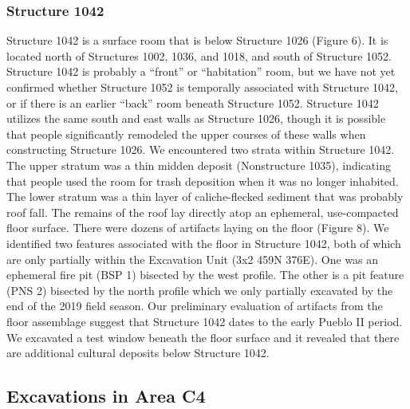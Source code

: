 \documentclass[
  12pt,
]{krantz}
\begin{document}
\hypertarget{structure-1042}{%
\subsubsection{Structure 1042}\label{structure-1042}}

Structure 1042 is a surface room that is below Structure 1026 (Figure
6). It is located north of Structures 1002, 1036, and 1018, and south of
Structure 1052. Structure 1042 is probably a ``front'' or ``habitation''
room, but we have not yet confirmed whether Structure 1052 is temporally
associated with Structure 1042, or if there is an earlier ``back'' room
beneath Structure 1052. Structure 1042 utilizes the same south and east
walls as Structure 1026, though it is possible that people significantly
remodeled the upper courses of these walls when constructing Structure
1026. We encountered two strata within Structure 1042. The upper stratum
was a thin midden deposit (Nonstructure 1035), indicating that people
used the room for trash deposition when it was no longer inhabited. The
lower stratum was a thin layer of caliche-flecked sediment that was
probably roof fall. The remains of the roof lay directly atop an
ephemeral, use-compacted floor surface. There were dozens of artifacts
laying on the floor (Figure 8). We identified two features associated
with the floor in Structure 1042, both of which are only partially
within the Excavation Unit (3x2 459N 376E). One was an ephemeral fire
pit (BSP 1) bisected by the west profile. The other is a pit feature
(PNS 2) bisected by the north profile which we only partially excavated
by the end of the 2019 field season. Our preliminary evaluation of
artifacts from the floor assemblage suggest that Structure 1042 dates to
the early Pueblo II period. We excavated a test window beneath the floor
surface and it revealed that there are additional cultural deposits
below Structure 1042.

\hypertarget{excavations-in-area-c4}{%
\subsection{Excavations in Area C4}\label{excavations-in-area-c4}}
\end{document}
